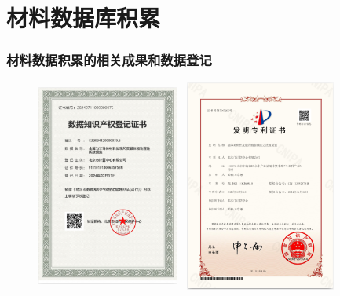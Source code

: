 \section{材料数据库积累}
\frame
{
	\frametitle{材料数据积累的相关成果和数据登记}
\begin{figure}[h!]
\vspace*{-0.05in}
\centering
\includegraphics[height=2.75in,width=1.85in,viewport=0 0 579 810,clip]{Figures/Registration_Certificate.png}
\includegraphics[height=2.75in,width=2.10in,viewport=0 0 609 799,clip]{Figures/Certificate-of-Patent.png}
\label{Certification}
\end{figure}
}

